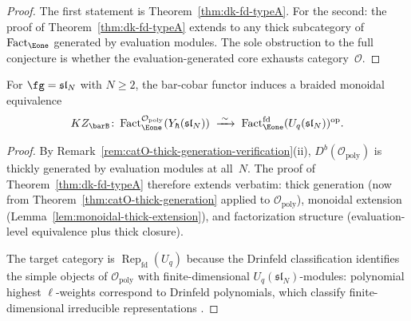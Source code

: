 \begin{proof}
The first statement is Theorem~\ref{thm:dk-fd-typeA}.  For the
second: the proof of Theorem~\ref{thm:dk-fd-typeA} extends to any
thick subcategory of $\operatorname{Fact}_{\Eone}$ generated by
evaluation modules.  The sole obstruction to the full conjecture is
whether the evaluation-generated core exhausts
category~$\mathcal{O}$.
\end{proof}

\begin{corollary}
\label{cor:dk-poly-catO}
For $\fg = \mathfrak{sl}_N$ with $N \ge 2$, the bar-cobar
functor induces a braided monoidal equivalence
\[
KZ_{\barB}\colon
\operatorname{Fact}_{\Eone}^{\mathcal{O}_{\mathrm{poly}}}
  (Y_\hbar(\mathfrak{sl}_N))
\;\xrightarrow{\;\sim\;}\;
\operatorname{Fact}_{\Eone}^{\mathrm{fd}}
  (U_q(\mathfrak{sl}_N))^{\mathrm{op}}.
\]
\end{corollary}

\begin{proof}
By Remark~\ref{rem:catO-thick-generation-verification}(ii),
$D^b(\mathcal{O}_{\mathrm{poly}})$ is thickly generated by
evaluation modules at all~$N$.  The proof of
Theorem~\ref{thm:dk-fd-typeA} therefore extends verbatim:
thick generation (now from
Theorem~\ref{thm:catO-thick-generation} applied to
$\mathcal{O}_{\mathrm{poly}}$), monoidal extension
(Lemma~\ref{lem:monoidal-thick-extension}), and factorization
structure (evaluation-level equivalence plus thick closure).

The target category is $\operatorname{Rep}_{\mathrm{fd}}(U_q)$
because the Drinfeld classification identifies the simple objects
of $\mathcal{O}_{\mathrm{poly}}$ with finite-dimensional
$U_q(\mathfrak{sl}_N)$-modules: polynomial highest $\ell$-weights
correspond to Drinfeld polynomials, which classify finite-dimensional
irreducible representations \cite{Drinfeld88}.
\end{proof}

